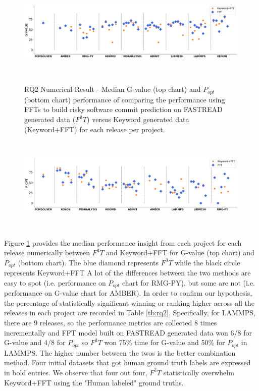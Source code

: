\documentclass[10pt,conference]{IEEEtran}
\begin{document}
\begin{figure}[!t]
\small
\vspace{-10pt}
\caption{RQ2 Numerical Result - Median G-value (top chart) and $P_{opt}$ (bottom chart) performance of comparing the performance using FFTs to build risky software commit prediction on FASTREAD generated data ($F^3T$) versus Keyword generated data (Keyword+FFT) for each release per project.}
\includegraphics[width=\linewidth, height=1.8in]{rq2_1.png}
\label{fig:rq2}
\vspace{-20pt}
\end{figure}
\begin{figure}[!t]
\small
\includegraphics[width=\linewidth, height=1.8in]{rq2_2.png}
\vspace{-20pt}
\end{figure}


 
 Figure \ref{fig:rq2} provides the median performance insight from each project for each release numerically between $F^3T$ and Keyword+FFT for G-value (top chart) and $P_{opt}$ (bottom chart). The blue diamond represents $F^3T$ while the black circle represents Keyword+FFT A lot of the differences between the two methods are easy to spot (i.e. performance on $P_{opt}$ chart for RMG-PY), but some are not (i.e. performance on G-value chart for AMBER). In order to confirm our hypothesis,
 the percentage of statistically significant winning or ranking higher across all the releases in each project are recorded in Table \ref{tb:rq2}. Specifically, for LAMMPS, there are 9 releases, so the performance metrics are collected 8 times incrementally and FFT model built on FASTREAD generated data won 6/8 for G-value and 4/8 for $P_{opt}$  so $F^3T$ won 75\% time for G-value and 50\% for $P_{opt}$ in LAMMPS. The higher number between the twos is the better combination method. Four initial datasets that got human ground truth labels are expressed in bold entries. We observe that four out four, $F^3T$ statistically overwhelm Keyword+FFT using the "Human labeled" ground truths.  
 
\end{document}
